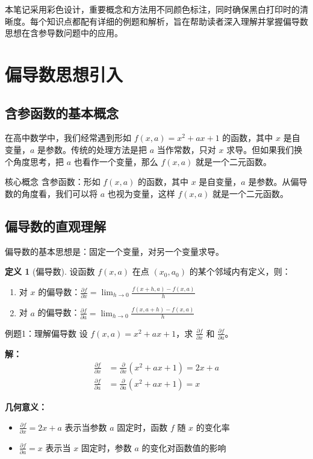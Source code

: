 \documentclass[a4paper,11pt]{ctexart}
\newcommand{\partialder}[2]{\frac{\partial #1}{\partial #2}}
\theoremstyle{definition}
\newtheorem{definition}{定义}[section]
\theoremstyle{remark}
\begin{document}
本笔记采用彩色设计，重要概念和方法用不同颜色标注，同时确保黑白打印时的清晰度。每个知识点都配有详细的例题和解析，旨在帮助读者深入理解并掌握偏导数思想在含参导数问题中的应用。

\section{偏导数思想引入}

\subsection{含参函数的基本概念}

在高中数学中，我们经常遇到形如 $f(x,a) = x^2 + ax + 1$ 的函数，其中 $x$ 是自变量，$a$ 是参数。传统的处理方法是把 $a$ 当作常数，只对 $x$ 求导。但如果我们换个角度思考，把 $a$ 也看作一个变量，那么 $f(x,a)$ 就是一个二元函数。

\begin{conceptbox}{核心概念}
含参函数：形如 $f(x,a)$ 的函数，其中 $x$ 是自变量，$a$ 是参数。从偏导数的角度看，我们可以将 $a$ 也视为变量，这样 $f(x,a)$ 就是一个二元函数。
\end{conceptbox}

\subsection{偏导数的直观理解}

偏导数的基本思想是：固定一个变量，对另一个变量求导。

\begin{definition}[偏导数]
设函数 $f(x,a)$ 在点 $(x_0, a_0)$ 的某个邻域内有定义，则：

\begin{enumerate}
    \item 对 $x$ 的偏导数：$\partialder{f}{x} = \lim_{h \to 0} \frac{f(x+h,a) - f(x,a)}{h}$
    \item 对 $a$ 的偏导数：$\partialder{f}{a} = \lim_{h \to 0} \frac{f(x,a+h) - f(x,a)}{h}$
\end{enumerate}
\end{definition}

\begin{examplebox}{例题1：理解偏导数}
设 $f(x,a) = x^2 + ax + 1$，求 $\partialder{f}{x}$ 和 $\partialder{f}{a}$。

\textbf{解：}
\begin{align}
\partialder{f}{x} &= \frac{\partial}{\partial x}(x^2 + ax + 1) = 2x + a \\
\partialder{f}{a} &= \frac{\partial}{\partial a}(x^2 + ax + 1) = x
\end{align}

\textbf{几何意义：}
\begin{itemize}
    \item $\partialder{f}{x} = 2x + a$ 表示当参数 $a$ 固定时，函数 $f$ 随 $x$ 的变化率
    \item $\partialder{f}{a} = x$ 表示当 $x$ 固定时，参数 $a$ 的变化对函数值的影响
\end{itemize}
\end{examplebox}
\end{document}
